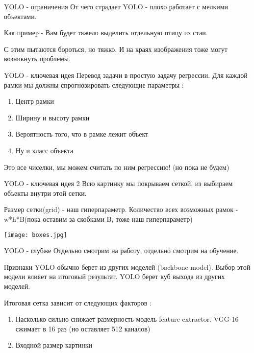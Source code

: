 \documentclass[notes,12pt, aspectratio=169]{beamer}
\begin{document}
\begin{frame}{YOLO - ограничения}
	От чего страдает YOLO - плохо работает с мелкими объектами.
	
	Как пример - Вам будет тяжело выделить отдельную птицу из стаи. 
	
	С этим пытаются бороться, но тяжко. И на краях изображения тоже могут возникнуть проблемы.

\end{frame}

\begin{frame}{YOLO - ключевая идея}
Перевод задачи в простую задачу регрессии. Для каждой рамки мы должны спрогнозировать следующие параметры : 

	\begin{enumerate}
	\item Центр рамки
	\item Ширину и высоту рамки
	\item Вероятность того, что в рамке лежит объект
	\item Ну и класс объекта
\end{enumerate}
Это все чиселки, мы можем считать по ним регрессию! (но пока не будем)
\end{frame}

\begin{frame}{YOLO - ключевая идея 2}
Всю картинку мы покрываем сеткой, из выбираем объекты внутри этой сетки. 

Размер сетки(grid) - наш гиперпараметр. Количество всех возможных рамок - w*h*B(пока оставим за скобками B, тоже наш гиперпараметр)

\begin{center}
	\texttt{[image: boxes.jpg]}
\end{center}
\end{frame}

\begin{frame}{YOLO - глубже}
	Отдельно смотрим на работу, отдельно смотрим на обучение.
	
Признаки YOLO обычно берет из других моделей (backbone model). Выбор этой модели влияет на итоговый результат. YOLO берет куб выхода из других моделей.

Итоговая сетка зависит от следующих факторов :
	\begin{enumerate}
	\item Насколько сильно снижает размерность модель feature extractor. VGG-16 сжимает в 16 раз (но оставляет 512 каналов)
	\item Входной размер картинки
\end{enumerate}


\end{frame}
\end{document}
